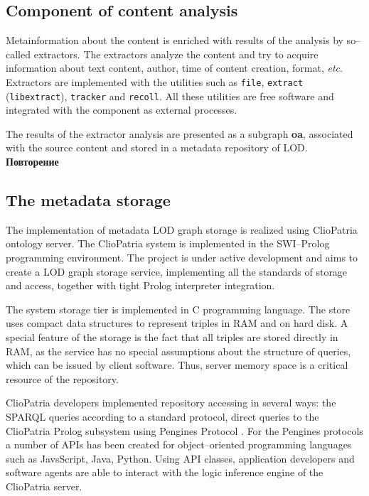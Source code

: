 \documentclass[conference,a4paper]{IEEEtran}
\begin{document}
\subsection{Component of content analysis}

Metainformation about the content is enriched with results of the analysis by so--called extractors. The extractors analyze the content and try to acquire information about text content, author, time of content creation, format, \emph{etc}. Extractors are implemented with the utilities such as \texttt{file}, \texttt{extract} (\texttt{libextract}), \texttt{tracker} and \texttt{recoll}.  All these utilities are free software and integrated with the component as external processes.

The results of the extractor analysis are presented as a subgraph \textbf{oa}, associated with the source content and stored in a metadata repository of LOD. \textbf{Повторение}

\subsection{The metadata storage}

The implementation of metadata LOD graph storage is realized using ClioPatria \cite{b8} ontology server.  The ClioPatria system is implemented in the SWI--Prolog programming environment.  The project is under active development and aims to create a LOD graph storage service, implementing all the standards of storage and access, together with tight Prolog interpreter integration.

The system storage tier is implemented in C programming language.  The store uses compact data structures to represent triples in RAM and on hard disk.  A special feature of the storage is the fact that all triples are stored directly in RAM, as the service has no special assumptions about the structure of queries, which can be issued by client software.  Thus, server memory space is a critical resource of the repository.

ClioPatria developers implemented repository accessing in several ways: the SPARQL queries according to a standard protocol, direct queries to the ClioPatria Prolog subsystem using Pengines Protocol \cite{b9}.  For the Pengines protocols a number of APIs has been created for object--oriented programming languages such as JavsScript, Java, Python.  Using API classes, application developers and software agents are able to interact with the logic inference engine of the ClioPatria server.
\end{document}
